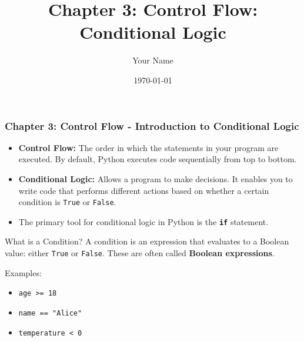\documentclass{beamer}
\title{Chapter 3: Control Flow: Conditional Logic}
\author{Your Name}
\institute{Your Institution}
\date{\today}
\begin{document}
\frame{\titlepage}

\begin{frame}[fragile]
    \frametitle{Chapter 3: Control Flow - Introduction to Conditional Logic}
    
    \begin{itemize}
        \item \textbf{Control Flow:} The order in which the statements in your program are executed. By default, Python executes code sequentially from top to bottom.
        
        \item \textbf{Conditional Logic:} Allows a program to make decisions. It enables you to write code that performs different actions based on whether a certain condition is \texttt{True} or \texttt{False}.
        
        \item The primary tool for conditional logic in Python is the \textbf{\texttt{if}} statement.
    \end{itemize}
    
    \begin{block}{What is a Condition?}
        A condition is an expression that evaluates to a Boolean value: either \texttt{True} or \texttt{False}. These are often called \textbf{Boolean expressions}.
        \vspace{0.5em}
        
        Examples:
        \begin{itemize}
            \item \texttt{age >= 18}
            \item \texttt{name == "Alice"}
            \item \texttt{temperature < 0}
        \end{itemize}
    \end{block}
    
\end{frame}
\end{document}
